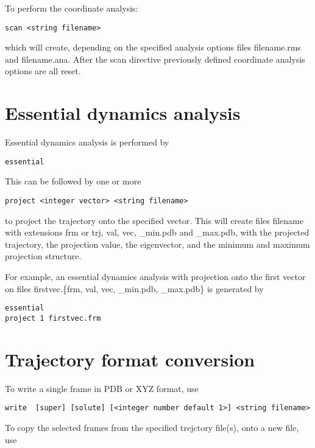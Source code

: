 To perform the coordinate analysis:

\begin{verbatim}
scan <string filename>
\end{verbatim}

which will create, depending on the specified analysis options
files filename.rms and filename.ana. After the scan directive
previously defined coordinate analysis options are all reset.

\section{Essential dynamics analysis}

Essential dynamics analysis is performed by

\begin{verbatim}
essential
\end{verbatim}

This can be followed by one or more

\begin{verbatim}
project <integer vector> <string filename>
\end{verbatim}

to project the trajectory onto the specified vector. This will
create files filename with extensions frm or trj, val, vec, \_min.pdb
and \_max.pdb, with the projected trajectory, the projection
value, the eigenvector, and the minimum and maximum projection
structure.

For example, an essential dynamics analysis with projection onto
the first vector on files firstvec.\{frm, val, vec, \_min.pdb, \_max.pdb\}
is generated by

\begin{verbatim}
essential
project 1 firstvec.frm
\end{verbatim}

\section{Trajectory format conversion}

To write a single frame in PDB or XYZ format, use

\begin{verbatim}
write  [super] [solute] [<integer number default 1>] <string filename>
\end{verbatim}

To copy the selected frames from the specified trejctory file(s),
onto a new file, use

